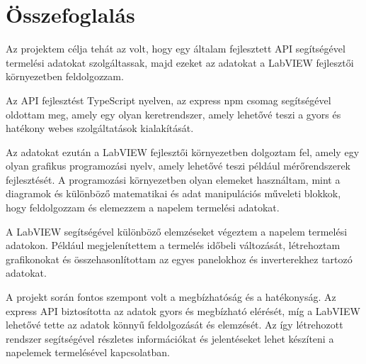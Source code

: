 \chapter{Összefoglalás}

Az projektem célja tehát az volt, hogy egy általam fejlesztett API segítségével
termelési adatokat szolgáltassak, majd ezeket az adatokat a LabVIEW fejlesztői
környezetben feldolgozzam.

Az API fejlesztést TypeScript nyelven, az express npm csomag segítségével
oldottam meg, amely egy olyan keretrendszer, amely lehetővé teszi a gyors és
hatékony webes szolgáltatások kialakítását.

Az adatokat ezután a LabVIEW fejlesztői környezetben dolgoztam fel, amely egy
olyan grafikus programozási nyelv, amely lehetővé teszi például mérőrendszerek
fejlesztését. A programozási környezetben olyan elemeket használtam, mint a
diagramok és különböző matematikai és adat manipulációs műveleti blokkok, hogy
feldolgozzam és elemezzem a napelem termelési adatokat.

A LabVIEW segítségével különböző elemzéseket végeztem a napelem termelési
adatokon. Például megjelenítettem a termelés időbeli változását, létrehoztam
grafikonokat és összehasonlítottam az egyes panelokhoz és inverterekhez tartozó
adatokat.

A projekt során fontos szempont volt a megbízhatóság és a hatékonyság. Az
express API biztosította az adatok gyors és megbízható elérését, míg a LabVIEW
lehetővé tette az adatok könnyű feldolgozását és elemzését. Az így létrehozott
rendszer segítségével részletes információkat és jelentéseket lehet készíteni a
napelemek termelésével kapcsolatban.
